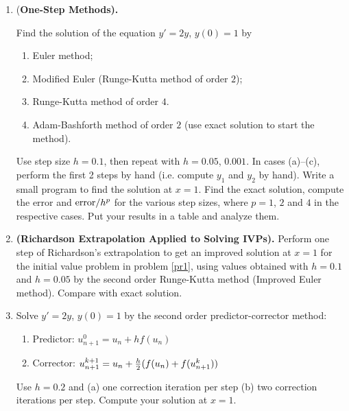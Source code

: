 \documentclass [12pt]{article}
\begin{document}
\begin{enumerate}

\item  {(\bf One-Step Methods).} \label{pr1}

Find the solution of the equation $y'=2y$, $y(0)=1$ by

\begin{enumerate}

\item Euler method;

\item Modified Euler (Runge-Kutta method of order $2$);

\item Runge-Kutta method of order $4$. 

\item Adam-Bashforth method of order $2$ (use exact solution to
start the method).

\end{enumerate}

Use step size $h=0.1$, then repeat with $h=0.05$, $0.001$. In
cases (a)--(c), perform the first 2 steps by hand (i.e. compute
$y_1$ and $y_2$ by hand). Write a small program to find the
solution at $x=1$. Find the exact solution, compute the error and
${\rm error}/h^p$ for the various step sizes, where $p=1$, $2$ and
$4$ in the respective cases. Put your results in a table and analyze them.

\item \textbf{(Richardson Extrapolation Applied to Solving IVPs).} 
 Perform one step of Richardson's extrapolation to get an improved solution
at $x=1$ for the initial value problem in problem \ref{pr1}, using values obtained with $h=0.1$ and $h=0.05$ by the
second order Runge-Kutta method (Improved Euler method). 
Compare with exact solution.



\item
Solve $y'=2y$, $y(0)=1$ by the second order predictor-corrector method:

\begin{enumerate}
\item Predictor: $u_{n+1}^0= u_n+hf(u_n)$
\item Corrector: $u_{n+1}^{k+1}=u_n+{{h}\over {2}}(f(u_n)+f(u_{n+1}^{k}))$

\end{enumerate}

Use $h=0.2$ and (a) one correction iteration per step (b) two
correction iterations per step. Compute your solution at $x=1$.


\end{enumerate}
\end{document}
